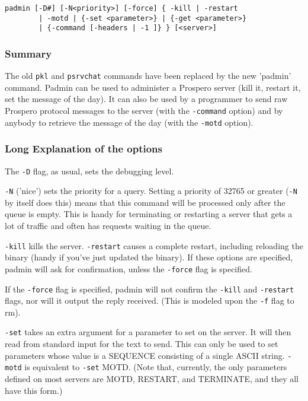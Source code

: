 \begin{verbatim}
padmin [-D#] [-N<priority>] [-force] { -kill | -restart
        | -motd | {-set <parameter>} | {-get <parameter>}
        | {-command [-headers | -1 ]} } [<server>]
\end{verbatim}

\subsubsection*{Summary}

The old {\tt pkl} and {\tt psrvchat} commands have been replaced by the new
'padmin' command.  Padmin can be used to administer a Prospero server
(kill it, restart it, set the message of the day).  It can also be
used by a programmer to send raw Prospero protocol messages to the
server (with the {\tt -command} option) and by anybody to retrieve the
message of the day (with the {\tt -motd} option).

\subsubsection*{Long Explanation of the options}

The {\tt -D} flag, as usual, sets the debugging level.

{\tt -N} ('nice') sets the priority for a query.  Setting a priority of
32765 or greater ({\tt -N} by itself does this) means that this command will
be processed only after the queue is empty.  This is handy for
terminating or restarting a server that gets a lot of traffic and
often has requests waiting in the queue.

{\tt -kill} kills the server.  {\tt -restart} causes a complete
restart, including reloading the binary (handy if you've just updated
the binary).  If these options are specified, padmin will ask for
confirmation, unless the {\tt -force} flag is specified.

If the {\tt -force} flag is specified, padmin will not confirm the {\tt -kill} and
{\tt -restart} flags, nor will it output the reply received.  (This is
modeled upon the {\tt -f} flag to rm).

{\tt -set} takes an extra argument for a parameter to set on the server.  It
will then read from standard input for the text to send.  This can
only be used to set parameters whose value is a SEQUENCE consisting of
a single ASCII string.  {\tt -motd} is equivalent to {\tt -set} MOTD.  (Note that,
currently, the only parameters defined on most servers are MOTD,
RESTART, and TERMINATE, and they all have this form.)

